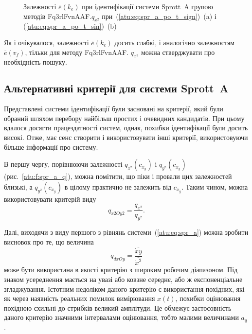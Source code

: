 \begin{figure}[htb!]
  \caption{Залежності $\overline{e} (k_e)$ при ідентифікації системи Sprott~A групою методів Fq3rlFvnAAF.$q_{x^2}$ при~(\ref{atu:eq:spr_a_po_t_sign})~(a) і (\ref{atu:eq:spr_a_po_t_sin})~(b)}
  \label{atu:f:spr_a_k_e_Fq3rlFvnAAF_q_x2}
\end{figure}

Як і очікувалося, залежності
$\overline{e}(k_e)$ досить слабкі, і аналогічно залежностям
$\overline{e}(v_f)$, тільки для методу Fq3rlFvnAAF.
$q_{x^2}$ можна стверджувати про необхідність пошуку.


\subsection{Альтернативні критерії для системи Sprott~A} %

Представлені системи ідентифікації були засновані на критерії,
який були обраний шляхом перебору найбільш простих і очевидних
кандидатів. При цьому вдалося досягти працездатності систем,
однак, похибки ідентифікації були досить високі. Отже, має
сенс створити і використовувати інші критерії, використовуючи
більше інформації про систему.

В першу чергу, порівнюючи залежності
$q_{x^2}(c_{x_y})$ і
$q_{y^2}(c_{x_y})$ (рис.~\ref{atu:f:spr_a_q}), можна помітити, що піки і провали
цих залежностей близькі, а
$q_{y^2} (c_{x_y})$ в цілому практично не залежить від
$c_{x_y}$. Таким чином, можна використовувати критерій виду
%
\[
  q_{x2Oy2} = \frac{q_{x^2}}{q_{y^2}}.
\]

Далі, виходячи з виду першого з рівнянь системи~(\ref{atu:eq:spr_a})
можна зробити висновок про те, що величина
%
\begin{equation}
  q_{dxOy} =
  \frac{\overline{\dot{x}y}}{\overline{\dot{x}^2}}
  \label{atu:eq:spr_a_q_dxyOdx2}
\end{equation}
%
може бути використана в якості критерію з широким робочим
діапазоном. Під знаком усереднення мається на увазі або ковзне
середнє, або ж експоненціальне згладжування. Істотним недоліком
даного критерію є використання похідних, які як через наявність реальних
помилок вимірювання
$x(t)$, похибки оцінювання похідною схильні до стрибків
великий амплітуди. Це обмежує застосовність даного критерію
значними інтервалами оцінювання, тобто малими величинами
$a_q$.

